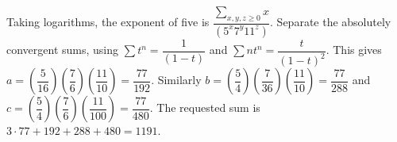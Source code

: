 Taking logarithms, the exponent of five is $\dfrac{\sum_{x,y,z\ge0}x}{(5^x7^y11^z)}$. Separate the absolutely convergent sums, using $\sum t^n=\dfrac{1}{(1-t)}$ and $\sum nt^n=\dfrac{t}{(1-t)^2}$. This gives $a=(\dfrac{5}{16})(\dfrac{7}{6})(\dfrac{11}{10})=\dfrac{77}{192}$. Similarly $b=(\dfrac{5}{4})(\dfrac{7}{36})(\dfrac{11}{10})=\dfrac{77}{288}$ and $c=(\dfrac{5}{4})(\dfrac{7}{6})(\dfrac{11}{100})=\dfrac{77}{480}$. The requested sum is $3\cdot77+192+288+480=\boxed{1191}$.

